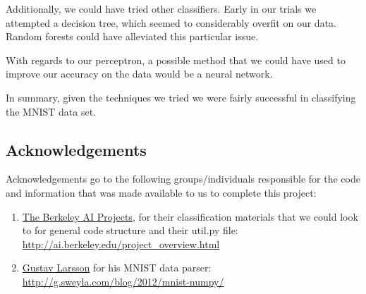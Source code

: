 \documentclass{article}
\theoremstyle{remark}
\begin{document}
     Additionally, we could have tried other classifiers. Early in our trials we attempted a decision tree, which seemed to considerably overfit on our data. Random forests could have alleviated this particular issue.

     With regards to our perceptron, a possible method that we could have used to improve our accuracy on the data would be a neural network.

     In summary, given the techniques we tried we were fairly successful in classifying the MNIST data set.


     \subsection*{Acknowledgements}

     Acknowledgements go to the following groups/individuals responsible for the code and information that was made available to us to complete this project:

     \begin{enumerate}
      \item \href{http://ai.berkeley.edu/project_overview.html}{The Berkeley AI Projects}, for their classification materials that we could look to for general code structure and their util.py file: \\
      \url{http://ai.berkeley.edu/project_overview.html}
      \item \href{http://g.sweyla.com/blog/2012/mnist-numpy/}{Gustav Larsson} for his MNIST data parser: \\
      \url{http://g.sweyla.com/blog/2012/mnist-numpy/}
     \end{enumerate}







    
\end{document}
